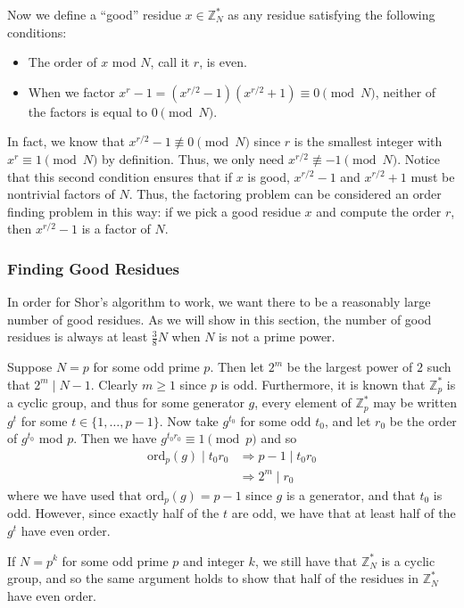 \documentclass[a4paper]{article}
\newcommand\0{\mathbf{0}}
\newcommand\ZZ{\mathbb{Z}}
\newcommand\<{\langle}
\renewcommand\>{\rangle}
\begin{document}
Now we define a ``good'' residue $x\in\ZZ_N^*$ as any residue satisfying the following conditions: 
\begin{itemize}
\item The order of $x$ mod $N$, call it $r$, is even.
\item When we factor $x^r-1 = (x^{r/2}-1)(x^{r/2}+1) \equiv 0 \pmod{N}$, neither of the factors is equal to $0\pmod{N}$.   
\end{itemize}
In fact, we know that $x^{r/2}-1\not\equiv 0\pmod{N}$ since $r$ is the smallest integer with $x^r\equiv 1\pmod{N}$ by definition. Thus, we only need $x^{r/2}\not\equiv -1\pmod{N}$. Notice that this second condition ensures that if $x$ is good, $x^{r/2}-1$ and $x^{r/2}+1$ must be nontrivial factors of $N$. Thus, the factoring problem can be considered an order finding problem in this way: if we pick a good residue $x$ and compute the order $r$, then $x^{r/2}-1$ is a factor of $N$. 

\subsubsection{Finding Good Residues}

In order for Shor's algorithm to work, we want there to be a reasonably large number of good residues. As we will show in this section, the number of good residues is always at least $\frac{3}{8}N$ when $N$ is not a prime power.

Suppose $N= p$ for some odd prime $p$. Then let $2^m$ be the largest power of $2$ such that $2^m\mid N-1$. Clearly $m\ge 1$ since $p$ is odd. Furthermore, it is known that $\ZZ_p^*$ is a cyclic group, and thus for some generator $g$, every element of $\ZZ_p^*$ may be written $g^t$ for some $t\in\{1,\ldots, p-1\}$.  Now take $g^{t_0}$ for some odd $t_0$, and let $r_0$ be the order of $g^{t_0}$ mod $p$. Then we have $g^{t_0r_0}\equiv 1\pmod{p}$ and so 
\begin{align*}
\text{ord}_p (g) \mid t_0r_0 &\Rightarrow p-1\mid t_0r_0 \\
&\Rightarrow 2^m \mid r_0
\end{align*} 
where we have used that $\text{ord}_p (g) = p-1$ since $g$ is a generator, and that $t_0$ is odd. However, since exactly half of the $t$ are odd, we have that at least half of the $g^t$ have even order.

If $N=p^k$ for some odd prime $p$ and integer $k$, we still have that $\ZZ_N^*$ is a cyclic group, and so the same argument holds to show that half of the residues in $\ZZ_N^*$ have even order.
\end{document}
